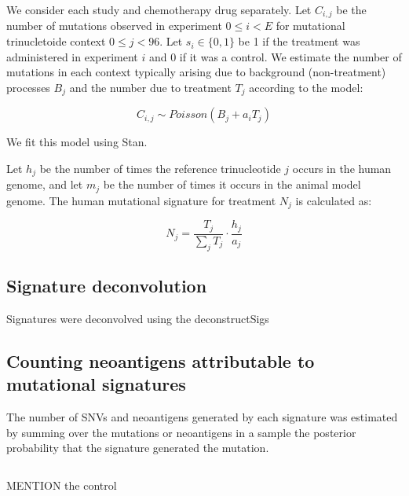 We consider each study and chemotherapy drug separately. Let $C_{i,j}$ be the number of mutations observed in experiment $0 \leq i \lt E$ for mutational trinucletoide context $0 \leq j \lt 96$. Let $s_i \in \{0,1\}$ be 1 if the treatment was administered in experiment $i$ and 0 if it was a control. We estimate the number of mutations in each context typically arising due to background (non-treatment) processes $B_j$ and the number due to treatment $T_j$ according to the model:

\[
C_{i,j} \sim \mathit{Poisson}(B_j + a_i T_j)
\]

We fit this model using Stan\cite{Gelman_2015}.

Let $h_j$ be the number of times the reference trinucleotide $j$ occurs in the human genome, and let $m_j$ be the number of times it occurs in the animal model genome. The human mutational signature for treatment $N_j$ is calculated as:

\[
N_j = \frac{T_j}{\sum_j{T_j}} \cdot \frac{h_j}{a_j}
\]


\subsection*{Signature deconvolution}
Signatures were deconvolved using the deconstructSigs\cite{Rosenthal_2016}

\subsection*{Counting neoantigens attributable to mutational signatures}
The number of SNVs and neoantigens generated by each signature was estimated by summing over the mutations or neoantigens in a sample the posterior probability that the signature generated the mutation.

\[



\]


MENTION the control




